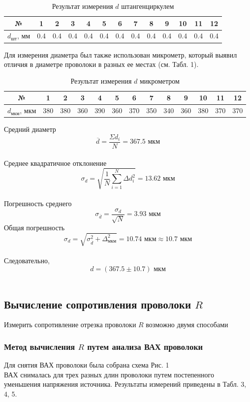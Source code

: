 \documentclass{article}
\begin{document}
	\begin{table}[H]
		\centering
		\begin{tabular}{|c|c|c|c|c|c|c|c|c|c|c|c|c|}
			\hline
			№ & 1 & 2 & 3 & 4 & 5 & 6 & 7 & 8 & 9 & 10 & 11 & 12 \\ \hline
			$d_{\text{шт}}$, мм & 0.4 & 0.4 & 0.4 & 0.4 & 0.4 & 0.4 & 0.4 & 0.4 & 0.4 & 0.4 & 0.4 & 0.4 \\ \hline
		\end{tabular}
		\caption{Результат измерения $d$ штангенциркулем}
	\end{table}
	Для измерения диаметра был также использован микрометр, который выявил отличия в диаметре проволоки в разных ее местах (см. Табл. 1).
	
	\begin{table}[H]
		
		\centering
		\begin{tabular}{|c|c|c|c|c|c|c|c|c|c|c|c|c|}
			\hline
			№ & 1 & 2 & 3 & 4 & 5 & 6 & 7 & 8 & 9 & 10 & 11 & 12 \\ \hline
			$d_{\text{мкм}}$, мкм & 380 & 380 & 360 & 390 & 360 & 370 & 350 & 340 & 360 & 380 & 370 & 370 \\ \hline
		\end{tabular}
		\caption{Результат измерения $d$ микрометром}
	\end{table}
	Средний диаметр $$\overline{d} = \frac{\Sigma d_{i}}{N} = 367.5 \text{ мкм}$$\\
	Среднее квадратичное отклонение $$\sigma_{d} = \sqrt{\frac{1}{N}\sum_{i = 1}^{N} \Delta d^{2}_{i}} = 13.62 \text{ мкм}$$\\
	Погрешность среднего $$\sigma_{\overline{d}} = \frac{\sigma_{d}}{\sqrt{N}} = 3.93 \text{ мкм}$$
	Общая погрешность $$\sigma_{d} = \sqrt{\sigma_{\overline{d}}^{2} + \Delta_{\text{мкм}}^{2}} = 10.74 \text{ мкм} \approx 10.7 \text{ мкм}$$\\
	
	Следовательно,\\
	$$d = (367.5 \pm 10.7) \text{ мкм}$$\\
	
	
	\subsection{Вычисление сопротивления проволоки $R$}
	Измерить сопротивление отрезка проволоки $R$ возможно двумя способами
	
	\subsubsection{Метод вычисления $R$ путем анализа ВАХ проволоки}
	Для снятия ВАХ проволоки была собрана схема Рис. 1\\
	ВАХ снималась для трех разных длин проволоки путем постепенного уменьшения напряжения источника. Результаты измерений приведены в Табл. 3, 4, 5.
	\\
	
\end{document}
